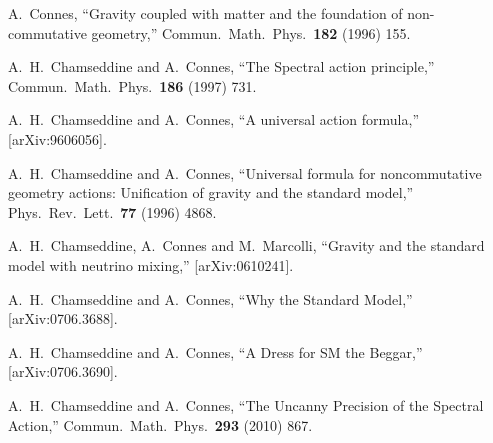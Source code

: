 \documentclass[12pt]{article}
\begin{document}
\raggedright
\begin{thebibliography}{99}






A.~Connes,
``Gravity coupled with matter and the foundation of non-commutative
geometry,''
Commun.\ Math.\ Phys.\  {\bf 182} (1996) 155.



  A.~H.~Chamseddine and A.~Connes,
  ``The Spectral action principle,''
  Commun.\ Math.\ Phys.\  {\bf 186} (1997) 731.



 
A.~H.~Chamseddine and A.~Connes,
``A universal action formula,''
[arXiv:9606056].




A.~H.~Chamseddine and A.~Connes,
``Universal formula for noncommutative geometry actions: Unification of
gravity and the standard model,''
Phys.\ Rev.\ Lett.\  {\bf 77} (1996) 4868.








  A.~H.~Chamseddine, A.~Connes and M.~Marcolli,
  ``Gravity and the standard model with neutrino mixing,''
  [arXiv:0610241].

  A.~H.~Chamseddine and A.~Connes,
  ``Why the Standard Model,''
  [arXiv:0706.3688].

  A.~H.~Chamseddine and A.~Connes,
  ``A Dress for SM the Beggar,''
  [arXiv:0706.3690].




  A.~H.~Chamseddine and A.~Connes,
  ``The Uncanny Precision of the Spectral Action,''
  Commun.\ Math.\ Phys.\  {\bf 293} (2010) 867.




\end{thebibliography}
\end{document}
